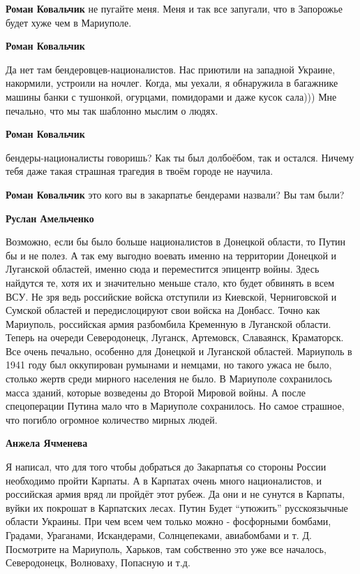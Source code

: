 \begin{itemize} %
\textbf{Роман Ковальчик} не пугайте меня. Меня и так все запугали, что в Запорожье будет хуже чем в Мариуполе.

\textbf{Роман Ковальчик} 

Да нет там бендеровцев-националистов. Нас приютили на западной Украине,
накормили, устроили на ночлег. Когда, мы уехали, я обнаружила в багажнике
машины банки с тушонкой, огурцами, помидорами и даже кусок сала))) Мне
печально, что мы так шаблонно мыслим о людях.

\textbf{Роман Ковальчик} 

бендеры-националисты говоришь? Как ты был долбоёбом, так и остался. Ничему тебя
даже такая страшная трагедия в твоём городе не научила.

\textbf{Роман Ковальчик} это кого вы в закарпатье бендерами назвали? Вы там были?

\textbf{Руслан Амельченко} 

Возможно, если бы было больше националистов в Донецкой области, то Путин бы и
не полез. А так ему выгодно воевать именно на территории Донецкой и Луганской
областей, именно сюда и переместится эпицентр войны. Здесь найдутся те, хотя их
и значительно меньше стало, кто будет обвинять в всем ВСУ. Не зря ведь
российские войска отступили из Киевской, Черниговской и Сумской областей и
передислоцируют свои войска на Донбасс. Точно как Мариуполь, российская армия
разбомбила Кременную в Луганской области. Теперь на очереди Северодонецк,
Луганск, Артемовск, Славаянск, Краматорск. Все очень печально, особенно для
Донецкой и Луганской областей. Мариуполь в 1941 году был оккупирован румынами и
немцами, но такого ужаса не было, столько жертв среди мирного населения не
было. В Мариуполе сохранилось масса зданий, которые возведены до Второй Мировой
войны. А после спецоперации Путина мало что в Мариуполе сохранилось. Но самое
страшное, что погибло огромное количество мирных людей.

\textbf{Анжела Ячменева} 

Я написал, что для того чтобы добраться до Закарпатья со стороны России
необходимо пройти Карпаты. А в Карпатах очень много националистов, и российская
армия вряд ли пройдёт этот рубеж. Да они и не сунутся в Карпаты, вуйки их
покрошат в Карпатских лесах. Путин Будет \enquote{утюжить} русскоязычные области
Украины. При чем всем чем только можно - фосфорными бомбами, Градами,
Ураганами, Искандерами, Солнцепеками, авиабомбами и т. Д. Посмотрите на
Мариуполь, Харьков, там собственно это уже все началось, Северодонецк,
Волноваху, Попасную и т.д.


\end{itemize}
